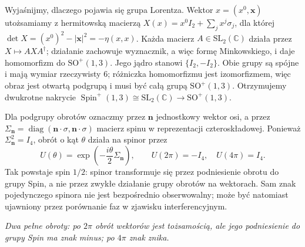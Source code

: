 Wyjaśnijmy, dlaczego pojawia się grupa Lorentza.
Wektor $x=(x^0,\mathbf x)$ utożsamiamy z hermitowską
macierzą $X(x)=x^0I_2+\sum_jx^j\sigma_j$, dla której
$\det X=(x^0)^2-|\mathbf x|^2=-\eta(x,x)$.
Każda macierz $A\in\mathrm{SL}_2(\mathbb C)$ działa przez
$X\mapsto AXA^\dagger$; działanie zachowuje wyznacznik,
a więc formę Minkowskiego, i daje homomorfizm do
$\mathrm{SO}^+(1,3)$. Jego jądro stanowi $\{I_2,-I_2\}$.
Obie grupy są spójne i mają wymiar rzeczywisty $6$;
różniczka homomorfizmu jest izomorfizmem,
więc obraz jest otwartą podgrupą i musi być całą
grupą $\mathrm{SO}^+(1,3)$. Otrzymujemy dwukrotne
nakrycie
$\operatorname{Spin}^+(1,3)\cong\mathrm{SL}_2(\mathbb C)
\longrightarrow\mathrm{SO}^+(1,3)$.

Dla podgrupy obrotów oznaczmy przez $\mathbf n$
jednostkowy wektor osi, a przez
$\Sigma_{\mathbf n}=\operatorname{diag}
(\mathbf n\cdot\sigma,\mathbf n\cdot\sigma)$
macierz spinu w reprezentacji czteroskładowej.
Ponieważ $\Sigma_{\mathbf n}^2=I_4$,
obrót o kąt $\theta$ działa na spinor przez
\[
 U(\theta)=\exp\!\left(-\frac{i\theta}{2}
   \Sigma_{\mathbf n}\right),\qquad
 U(2\pi)=-I_4,\quad U(4\pi)=I_4.
\]
Tak powstaje spin $1/2$: spinor transformuje się przez
podniesienie obrotu do grupy Spin, a nie przez zwykłe
działanie grupy obrotów na wektorach.
Sam znak pojedynczego spinora nie jest bezpośrednio
obserwowalny; może być natomiast ujawniony przez
porównanie faz w zjawisku interferencyjnym.

\begin{center}

{\small\itshape Dwa pełne obroty: po $2\pi$ obrót wektorów
jest tożsamością, ale jego podniesienie do grupy Spin
ma znak minus; po $4\pi$ znak znika.}
\end{center}

